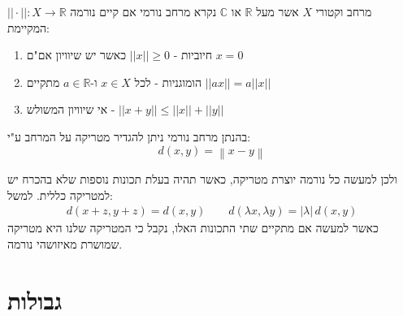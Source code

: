 \documentclass{tstextbook}
\begin{document}
\begin{definition}[נורמה]
מרחב וקטורי \(X\) אשר מעל \(\mathbb{R}\) או \(\mathbb{C}\) נקרא מרחב נורמי אם קיים נורמה \(||\cdot||:X\to \mathbb{R}\) המקיימת:

\end{definition}
\begin{enumerate}
  \item חיוביות - \(||x||\geq 0\) כאשר יש שיוויון אם"ם \(x=0\)


  \item הומוגניות - לכל \(x \in X\) ו-\(a\in \mathbb{R}\) מתקיים \(||ax||=a||x||\)


  \item אי שיוויון המשולש - \(||x+y||\leq||x||+||y||\)


\end{enumerate}
\begin{definition}
בהנתן מרחב נורמי ניתן להגדיר מטריקה על המרחב ע"י:
$$d(x,y)=\left\|x-y\right\|$$

\end{definition}
ולכן למעשה כל נורמה יוצרת מטריקה, כאשר תהיה בעלת תכונות נוספות שלא בהכרח יש למטריקה כללית. למשל:
$$\begin{array}{c}{{d(x+z,y+z)=d(x,y)}}\qquad  {{d\left( \lambda x,\lambda y \right)=|\lambda|\,d(x,y)}}\end{array}$$
כאשר למעשה אם מתקיים שתי התכונות האלו, נקבל כי המטריקה שלנו היא מטריקה שמושרת מאיזושהי נורמה.

\section{גבולות}
\end{document}
